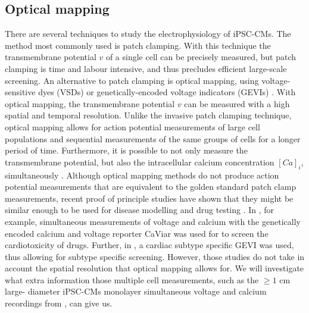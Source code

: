 \documentclass[12pt,a4paper]{article}
\begin{document}
\subsection{Optical mapping}
There are several techniques to study the electrophysiology of iPSC-CMs. The method most commonly used is patch clamping. With this technique the transmembrane potential $v$ of a single cell can be precisely measured, but patch clamping is time and labour intensive, and thus precludes efficient large-scale screening. An alternative to patch clamping is optical mapping, using voltage-sensitive dyes (VSDs) or genetically-encoded voltage indicators (GEVIs) \cite{Denning2016}. With optical mapping, the transmembrane potential $v$ can be measured with a high spatial and temporal resolution. Unlike the invasive patch clamping technique, optical mapping allows for action potential measurements of large cell populations and sequential measurements of the same groups of cells for a longer period of time. Furthermore, it is possible to not only measure the transmembrane potential, but also the intracellular calcium concentration $[Ca]_i$, simultaneously \cite{Lee2012}. 
Although optical mapping methods do not produce action potential measurements that are equivalent to the golden standard patch clamp measurements, recent proof of principle studies have shown that they might be similar enough to be used for disease modelling and drug testing \cite{Shukla2017}. In \cite{Dempsey2016}, for example, simultaneous measurements of voltage and calcium with the genetically encoded calcium and voltage reporter CaViar was used for to screen the cardiotoxicity of drugs. Further, in \cite{Chen2016},
a cardiac subtype specific GEVI was used, thus allowing for subtype specific screening. However, those studies do not take in account the spatial resolution that optical mapping allows for. We will investigate what extra information those multiple cell measurements, such as the $\ge1$ cm large- diameter iPSC-CMs monolayer simultaneous voltage and calcium recordings from \cite{Lee2012}, can give us.
%
\end{document}
